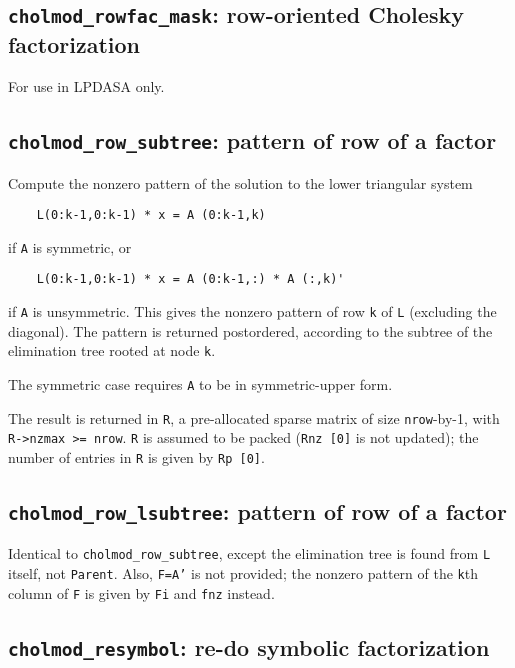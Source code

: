 \documentclass[11pt]{article}
\begin{document}
\subsection{{\tt cholmod\_rowfac\_mask}: row-oriented Cholesky factorization}


For use in LPDASA only.


\newpage \subsection{{\tt cholmod\_row\_subtree}: pattern of row of a factor}


Compute the nonzero pattern of the solution to the lower triangular system
\begin{verbatim}
    L(0:k-1,0:k-1) * x = A (0:k-1,k)
\end{verbatim}
if {\tt A} is symmetric, or
\begin{verbatim}
    L(0:k-1,0:k-1) * x = A (0:k-1,:) * A (:,k)'
\end{verbatim}
if {\tt A} is unsymmetric.
This gives the nonzero pattern of row {\tt k} of {\tt L} (excluding the diagonal).
The pattern is returned postordered, according to the subtree of the elimination
tree rooted at node {\tt k}.

The symmetric case requires {\tt A} to be in symmetric-upper form.

The result is returned in {\tt R}, a pre-allocated sparse matrix of size {\tt nrow}-by-1,
with {\tt R->nzmax >= nrow}.  {\tt R} is assumed to be packed ({\tt Rnz [0]} is not updated);
the number of entries in {\tt R} is given by {\tt Rp [0]}.

\newpage \subsection{{\tt cholmod\_row\_lsubtree}: pattern of row of a factor}


Identical to {\tt cholmod\_row\_subtree}, except the elimination tree is
found from {\tt L} itself, not {\tt Parent}.  Also, {\tt F=A'} is not provided;
the nonzero pattern of the {\tt k}th column of {\tt F} is given by 
{\tt Fi} and {\tt fnz} instead.

\newpage \subsection{{\tt cholmod\_resymbol}: re-do symbolic factorization}
\end{document}
